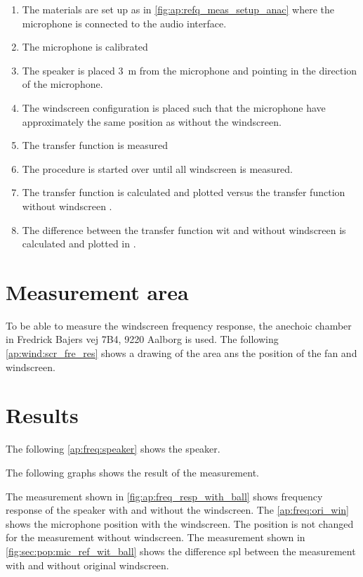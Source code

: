 \begin{enumerate}
\item The materials are set up as in \autoref{fig:ap:refq_meas_setup_anac} where the  microphone is connected to the audio interface.
\item The microphone is calibrated
\item The speaker is placed \SI{3}{\meter} from the microphone and pointing in the direction of the microphone.
\item	The windscreen configuration is placed such that the microphone have approximately the same position as without the windscreen.
\item The transfer function is measured 
\item The procedure is started over until all windscreen is measured.
\item The transfer function is calculated and plotted versus the transfer function without windscreen \matlab.
\item The difference between the transfer function wit and without windscreen is calculated and plotted in \matlab.
\end{enumerate}


\section*{Measurement area}
To be able to measure the windscreen frequency response, the anechoic chamber in Fredrick Bajers vej 7B4, 9220 Aalborg is used. The following \autoref{ap:wind:scr_fre_res} shows a drawing of the area ans the position of the fan and windscreen.


\section*{Results}

The following \autoref{ap:freq:speaker} shows the speaker.


The following graphs shows the result of the measurement. 

The measurement shown in \autoref{fig:ap:freq_resp_with_ball} shows frequency response of the speaker with and without the windscreen. The \autoref{ap:freq:ori_win} shows the microphone position with the windscreen. The position is not changed for the measurement without windscreen. 
The measurement shown in \autoref{fig:sec:pop:mic_ref_wit_ball} shows the difference \gls{spl} between the measurement with and without original windscreen. 

